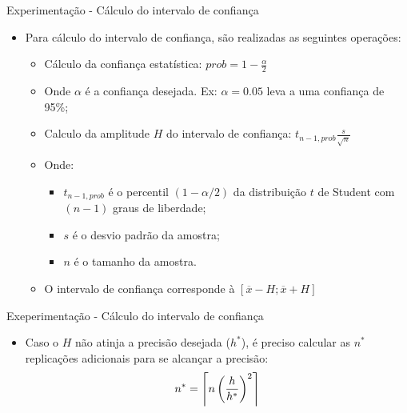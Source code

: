\documentclass[xcolor=dvipsnames]{beamer}
\let\olditem=\item%
\renewcommand{\item}{\olditem \justifying}%
\begin{document}
\begin{frame}{Experimentação - Cálculo do intervalo de confiança}
	\begin{itemize}
		\item Para cálculo do intervalo de confiança, são realizadas as seguintes operações:
        		\medskip
		      \begin{itemize}
		      	\item Cálculo da confiança estatística: $ prob = 1 - \frac{\alpha}{2} $
                \bigskip
		      	\item Onde $\alpha$ é a confiança desejada. Ex: $\alpha=0.05$ leva a uma confiança de 95\%;
		      	      \bigskip
		      	\item Calculo da amplitude $H$ do intervalo de confiança: $ t_{n-1, prob}\frac{s}{\sqrt{n}} $
                \bigskip
		      	\item Onde:
		      	      \begin{itemize}
		      	      	\item $t_{n-1, prob}$ é o percentil $(1-\alpha/2)$ da distribuição $t$ de Student com $(n-1)$ graus de liberdade;
                        \medskip
		      	      	\item $s$ é o desvio padrão da amostra;
                        \medskip
		      	      	\item $n$ é o tamanho da amostra.
                        \medskip
		      	      \end{itemize}
		      	\item O intervalo de confiança corresponde à $[\overline{x}-H ; \overline{x}+H]$
		      \end{itemize}
	\end{itemize}
\end{frame}
	
\begin{frame}{Exeperimentação - Cálculo do intervalo de confiança}
	\begin{itemize}
		\item Caso o $H$ não atinja a precisão desejada ($h^*$), é preciso calcular as $n^*$ replicações adicionais para se alcançar a precisão: $$ n^* = \ceil*[\big]{n\left(\frac{h}{h^*}\right)^2 }$$
	\end{itemize}
\end{frame}
	
\end{document}
